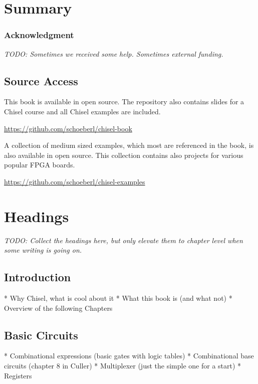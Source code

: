 \documentclass[%
    10pt, %
    headinclude, footexclude,
    openright, %
    notitlepage,
    cleardoubleempty,
    headsepline,
    pointlessnumbers,
    bibtotoc, idxtotoc,
    ]{scrbook}
\newcommand{\todo}[1]{{\emph{TODO: #1}}}
\begin{document}
\chapter{Summary}
\label{sec:conclusion}

\subsection*{Acknowledgment}

\todo{Sometimes we received some help. Sometimes external funding.}



\section*{Source Access}

This book is available in open source.
The repository also contains slides for a Chisel course and
all Chisel examples are included.

\url{https://github.com/schoeberl/chisel-book}



A collection of medium sized examples, which most are referenced
in the book, is also available in open source. This collection
contains also projects for various popular FPGA boards.

\url{https://github.com/schoeberl/chisel-examples}

\chapter{Headings}

\todo{Collect the headings here, but only elevate them to chapter level when some
writing is going on.}

\section{Introduction}

 * Why Chisel, what is cool about it
 * What this book is (and what not)
 * Overview of the following Chapters

\section{Basic Circuits}

 * Combinational expressions (basic gates with logic tables)
 * Combinational base circuits (chapter 8 in Culler)
 * Multiplexer (just the simple one for a start)
 * Registers
\end{document}

